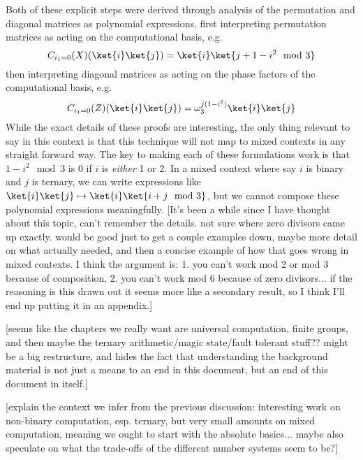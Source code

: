 Both of these explicit steps were derived through analysis of the permutation and diagonal matrices as polynomial expressions, first interpreting permutation matrices as acting on the computational basis, e.g.
\[C_{i_1=0}(X)(\ket{i}\ket{j}) = \ket{i}\ket{j+1-i^2 \mod 3}\]
then interpreting diagonal matrices as acting on the phase factors of the computational basis, e.g.
\[C_{i_1=0}(Z)(\ket{i}\ket{j}) = \omega_{3}^{j(1-i^2)}\ket{i}\ket{j}\]
While the exact details of these proofs are interesting, the only thing relevant to say in this context is that this technique will not map to mixed contexts in any straight forward way. The key to making each of these formulations work is that $1 - i^2 \mod 3$ is 0 if $i$ is \emph{either} 1 or 2. In a mixed context where say $i$ is binary and $j$ is ternary, we can write expressions like $\ket{i}\ket{j} \mapsto \ket{i}\ket{i + j \mod 3}$, but we cannot compose these polynomial expressions meaningfully. [It's been a while since I have thought about this topic, can't remember the details. not sure where zero divisors came up exactly. would be good just to get a couple examples down, maybe more detail on what \cite{arithmetics} actually needed, and then a concise example of how that goes wrong in mixed contexts. I think the argument is: 1. you can't work mod 2 or mod 3 because of composition, 2. you can't work mod 6 because of zero divisors... if the reasoning is this drawn out it seems more like a secondary result, so I think I'll end up putting it in an appendix.]


[seems like the chapters we really want are universal computation, finite groups, and then maybe the ternary arithmetic/magic state/fault tolerant stuff?? might be a big restructure, and hides the fact that understanding the background material is not just a means to an end in this document, but an end of this document in itself.]

[explain the context we infer from the previous discussion: interesting work on non-binary computation, esp. ternary, but very small amounts on mixed computation, meaning we ought to start with the absolute basics... maybe also speculate on what the trade-offs of the different number systems seem to be?]

